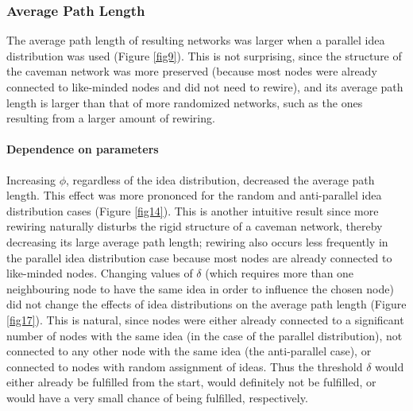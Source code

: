 \subsubsection{Average Path Length}
The average path length of resulting networks was larger when a parallel idea distribution was used (Figure \ref{fig9}). This is not surprising, since the structure of the caveman network was more preserved (because most nodes were already connected to like-minded nodes and did not need to rewire), and its average path length is larger than that of more randomized networks, such as the ones resulting from a larger amount of rewiring. 
\paragraph{Dependence on parameters}
Increasing $\phi$, regardless of the idea distribution, decreased the average path length. This effect was more prononced for the random and anti-parallel idea distribution cases (Figure \ref{fig14}). This is another intuitive result since more rewiring naturally disturbs the rigid structure of a caveman network, thereby decreasing its large average path length; rewiring also occurs less frequently in the parallel idea distribution case because most nodes are already connected to like-minded nodes.
Changing values of $\delta$ (which requires more than one neighbouring node to have the same idea in order to influence the chosen node) did not change the effects of idea distributions on the average path length (Figure \ref{fig17}). This is natural, since nodes were either already connected to a significant number of nodes with the same idea (in the case of the parallel distribution), not connected to any other node with the same idea (the anti-parallel case), or connected to nodes with random assignment of ideas. Thus the threshold $\delta$ would either already be fulfilled from the start, would definitely not be fulfilled, or would have a very small chance of being fulfilled, respectively.

